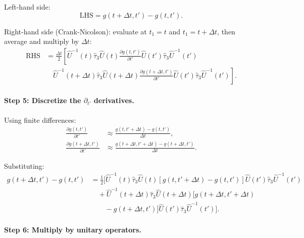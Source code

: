 \documentclass[11pt]{article}
\begin{document}
Left-hand side:
\begin{equation}
\text{LHS} = g(t+\Delta t, t') - g(t, t').
\end{equation}

Right-hand side (Crank-Nicolson): evaluate at $t_1 = t$ and $t_1 = t+\Delta t$, then average and multiply by $\Delta t$:
\begin{equation}
\begin{split}
\text{RHS} &= \frac{\Delta t}{2} \left[\hat{U}^{-1}(t) \hat{\tau}_3 \hat{U}(t) \frac{\partial g(t, t')}{\partial t'} \hat{U}(t') \hat{\tau}_3 \hat{U}^{-1}(t') \right. \\
&\quad \left.  \hat{U}^{-1}(t+\Delta t) \hat{\tau}_3 \hat{U}(t+\Delta t) \frac{\partial g(t+\Delta t, t')}{\partial t'} \hat{U}(t') \hat{\tau}_3 \hat{U}^{-1}(t')\right].
\end{split}
\end{equation}

\paragraph{Step 5: Discretize the $\partial_{t'}$ derivatives.}

Using finite differences:
\begin{align}
\frac{\partial g(t, t')}{\partial t'} &\approx \frac{g(t, t'+\Delta t) - g(t, t')}{\Delta t}, \\
\frac{\partial g(t+\Delta t, t')}{\partial t'} &\approx \frac{g(t+\Delta t, t'+\Delta t) - g(t+\Delta t, t')}{\Delta t}.
\end{align}

Substituting:
\begin{equation}
\begin{split}
g(t+\Delta t, t') - g(t, t') &= \frac{1}{2} \Big[\hat{U}^{-1}(t) \hat{\tau}_3 \hat{U}(t) [g(t, t'+\Delta t) - g(t, t')] \hat{U}(t') \hat{\tau}_3 \hat{U}^{-1}(t') \\
&\quad + \hat{U}^{-1}(t+\Delta t) \hat{\tau}_3 \hat{U}(t+\Delta t) [g(t+\Delta t, t'+\Delta t) \\
&\quad\quad - g(t+\Delta t, t')] \hat{U}(t') \hat{\tau}_3 \hat{U}^{-1}(t')\Big].
\end{split}
\end{equation}

\paragraph{Step 6: Multiply by unitary operators.}
\end{document}
